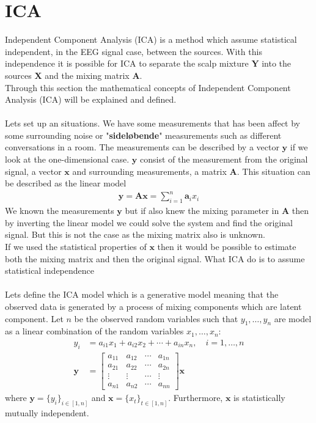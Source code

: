 \section{ICA}
Independent Component Analysis (ICA) is a method which assume statistical independent, in the EEG signal case, between the sources. With this independence it is possible for ICA to separate the scalp mixture $\mathbf{Y}$ into the sources $\mathbf{X}$ and the mixing matrix $\mathbf{A}$.
\\
Through this section the mathematical concepts of Independent Component Analysis (ICA) will be explained and defined.
\\ \\
Lets set up an situations. We have some measurements that has been affect by some surrounding noise or "\textbf{sideløbende}" measurements such as different conversations in a room. The measurements can be described by a vector $\mathbf{y}$ if we look at the one-dimensional case. $\mathbf{y}$ consist of the measurement from the original signal, a vector $\mathbf{x}$ and surrounding measurements, a matrix $\mathbf{A}$. This situation can be described as the linear model
\begin{align*}
\mathbf{y} = \mathbf{Ax} = \sum_{i=1}^n \mathbf{a}_i x_i
\end{align*}
We known the measurements $\mathbf{y}$ but if also knew the mixing parameter in $\mathbf{A}$ then by inverting the linear model we could solve the system and find the original signal. But this is not the case as the mixing matrix also is unknown.
\\
If we used the statistical properties of $\mathbf{x}$ then it would be possible to estimate both the mixing matrix and then the original signal. What ICA do is to assume statistical independence 
\\ \\
Lets define the ICA model which is a generative model meaning that the observed data is generated by a process of mixing components which are latent component. Let $n$ be the observed random variables such that $y_1, \dots, y_n$ are model as a linear combination of the random variables $x_1, \dots, x_n$:
\begin{align*}
y_i &= a_{i1} x_1 + a_{i2} x_2 + \cdots + a_{in} x_n, \quad i = 1, \dots, n \\
\mathbf{y} &= 
\begin{bmatrix}
a_{11} & a_{12} & \cdots & a_{1n} \\
a_{21} & a_{22} & \cdots & a_{2n} \\
\vdots & \vdots & \cdots & \vdots \\
a_{n1} & a_{n2} & \cdots & a_{nn}
\end{bmatrix}
\mathbf{x}
\end{align*}
where $\mathbf{y} = \{ y_i \}_{i \in [1,n]}$ and $\mathbf{x} = \{ x_t \}_{t \in [1,n]}$. Furthermore, $\mathbf{x}$ is statistically mutually independent.

